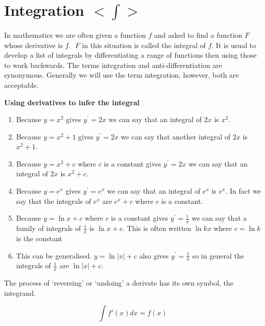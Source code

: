 \chapter[Integration]{Integration $<\int>$}
In mathematics we are often given a function $f$ and asked to find a function $F$ whose derivative is $f$. $\;F$ in this situation is called the integral of $f$. It is usual to develop a list of integrals by differentiating a range of functions then using those to work backwards. The terms integration and anti-differentiation are synonymous. Generally we will use the term integration, however, both are acceptable.

\textbf{Using derivatives to infer the integral}
\begin{enumerate}
\item Because $y =x^{2}$ gives $y^{ \prime } =2 x$ we can say that an integral of $2 x$ is $x^{2}$. 

\item Because $y =x^{2} +1$ gives $y^{ \prime } =2 x$ we can say that another integral of $2 x$ is $x^{2} +1$. 

\item Because $y =x^{2} +c$ where $c$ is a constant gives $y^{ \prime } =2 x$ we can say that an integral of $2 x$ is $x^{2} +c$. 

\item Because $y =e^{x}$ gives $y^{ \prime } =e^{x}$ we can say that an integral of $e^{x}$ is $e^{x}$. In fact we say that the integrals of $e^{x}$ are $e^{x} +c$ where $c$ is a constant. 

\item Because $y =\ln  x +c$ where $c$ is a constant gives $y^{ \prime } =\frac{1}{x}$ we can say that a family of integrals of $\frac{1}{x}$ is $\ln  x +c$. This is often written $\ln  k x$ where $c =\ln  k$ is the constant 

\item This can be generalised. $y =\ln  \left \vert x\right \vert  +c$ also gives $y^{ \prime } =\frac{1}{x}$ so in general the integrals of $\frac{1}{x}$ are $\ln  \left \vert x\right \vert  +c$. \end{enumerate}

The process of `reversing' or `undoing' a derivate has its own symbol, the integrand.
\begin{tcolorbox}
	\[\int f'(x) dx = f(x)\]
\end{tcolorbox}

